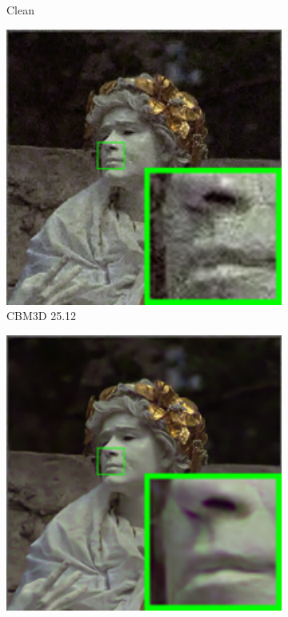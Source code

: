 \begin{figure}
\begin{subfigure}[t]{0.19\textwidth}
		\caption{Clean}
    \end{subfigure}
    \hfill
    \begin{subfigure}[t]{0.19\textwidth}
        \centering
        \includegraphics[width=1\textwidth]{images/mcwnnm/24images/resize_br_CBM3D_nSig301050_kodim17.png}
		\caption{CBM3D 25.12}
    \end{subfigure}
    \hfill
    \begin{subfigure}[t]{0.19\textwidth}
        \centering
        \includegraphics[width=1\textwidth]{images/mcwnnm/24images/resize_br_MLP_nSig301050_kodim17.png}

\end{subfigure}
\end{figure}
